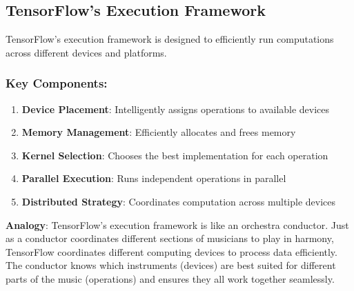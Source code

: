 \documentclass[
  letterpaper,
  DIV=11,
  numbers=noendperiod]{scrreprt}
\providecommand{\tightlist}{%
  \setlength{\itemsep}{0pt}\setlength{\parskip}{0pt}}\usepackage{longtable,booktabs,array}
\begin{document}
\subsection{TensorFlow's Execution
Framework}\label{tensorflows-execution-framework}

TensorFlow's execution framework is designed to efficiently run
computations across different devices and platforms.

\subsubsection{Key Components:}\label{key-components}

\begin{enumerate}
\def\labelenumi{\arabic{enumi}.}
\tightlist
\item
  \textbf{Device Placement}: Intelligently assigns operations to
  available devices
\item
  \textbf{Memory Management}: Efficiently allocates and frees memory
\item
  \textbf{Kernel Selection}: Chooses the best implementation for each
  operation
\item
  \textbf{Parallel Execution}: Runs independent operations in parallel
\item
  \textbf{Distributed Strategy}: Coordinates computation across multiple
  devices
\end{enumerate}

\textbf{Analogy}: TensorFlow's execution framework is like an orchestra
conductor. Just as a conductor coordinates different sections of
musicians to play in harmony, TensorFlow coordinates different computing
devices to process data efficiently. The conductor knows which
instruments (devices) are best suited for different parts of the music
(operations) and ensures they all work together seamlessly.
\end{document}
